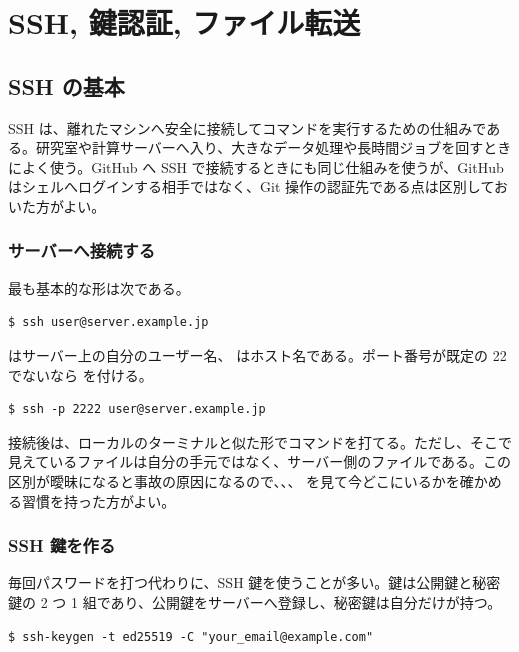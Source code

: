 \chapter{SSH, 鍵認証, ファイル転送}
\label{app:ssh}

\section{SSH の基本}

SSH は、離れたマシンへ安全に接続してコマンドを実行するための仕組みである。研究室や計算サーバーへ入り、大きなデータ処理や長時間ジョブを回すときによく使う。GitHub へ SSH で接続するときにも同じ仕組みを使うが、GitHub はシェルへログインする相手ではなく、Git 操作の認証先である点は区別しておいた方がよい。

\subsection{サーバーへ接続する}

最も基本的な形は次である。

\begin{lstlisting}[numbers=none, xleftmargin=2\zw]
$ ssh user@server.example.jp
\end{lstlisting}

 はサーバー上の自分のユーザー名、 はホスト名である。ポート番号が既定の 22 でないなら  を付ける。

\begin{lstlisting}[numbers=none, xleftmargin=2\zw]
$ ssh -p 2222 user@server.example.jp
\end{lstlisting}

接続後は、ローカルのターミナルと似た形でコマンドを打てる。ただし、そこで見えているファイルは自分の手元ではなく、サーバー側のファイルである。この区別が曖昧になると事故の原因になるので、、、 を見て今どこにいるかを確かめる習慣を持った方がよい。

\subsection{SSH 鍵を作る}

毎回パスワードを打つ代わりに、SSH 鍵を使うことが多い。鍵は公開鍵と秘密鍵の 2 つ 1 組であり、公開鍵をサーバーへ登録し、秘密鍵は自分だけが持つ。

\begin{lstlisting}[numbers=none, xleftmargin=2\zw]
$ ssh-keygen -t ed25519 -C "your_email@example.com"
\end{lstlisting}

